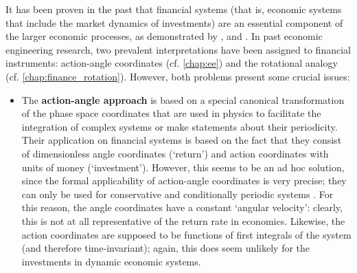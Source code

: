 It has been proven in the past that financial systems (that is, economic systems that include the market dynamics of investments) are an essential component of the larger economic processes, as demonstrated by \citet{Kruimer2021}, \citet{Vos2019} and \citet{VanArdenne2020}. In past economic engineering research, two prevalent interpretations have been assigned to financial instruments: action-angle coordinates (cf. \cref{chap:ee}) and the rotational analogy (cf. \cref{chap:finance_rotation}). However, both problems present some crucial issues:
\begin{itemize}
    \item The \textbf{action-angle approach} is based on a special canonical transformation of the phase space coordinates that are used in physics to facilitate the integration of complex systems or make statements about their periodicity. Their application on financial systems is based on the fact that they consist of dimensionless angle coordinates (`return') and action coordinates with units of money (`investment'). However, this seems to be an ad hoc solution, since the formal applicability of action-angle coordinates is very precise; they can only be used for conservative and conditionally periodic systems \cite{Arnold1989}. For this reason, the angle coordinates have a constant `angular velocity': clearly, this is not at all representative of the return rate in economics. Likewise, the action coordinates are supposed to be functions of first integrals of the system (and therefore time-invariant); again, this does seem unlikely for the investments in dynamic economic systems. 
    

\end{itemize}
